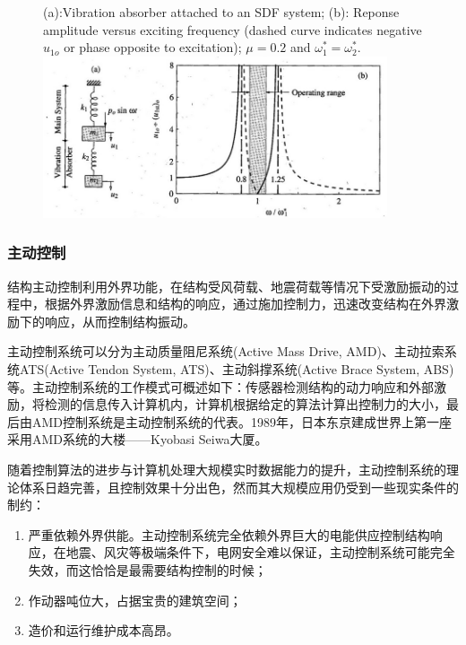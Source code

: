 	\begin{figure}[H]
		\centering
		{(a):Vibration absorber attached to an SDF system; (b): Reponse amplitude versus exciting frequency (dashed curve indicates negative $u_{1o}$ or phase opposite to excitation); $\mu=0.2$ and $\omega_1^*=\omega_2^*$.}
		\label{double}
		\includegraphics[width=4in]{figure/double}
	\end{figure}
	

\subsubsection{主动控制}
结构主动控制利用外界功能，在结构受风荷载、地震荷载等情况下受激励振动的过程中，根据外界激励信息和结构的响应，通过施加控制力，迅速改变结构在外界激励下的响应，从而控制结构振动。

主动控制系统可以分为主动质量阻尼系统(Active Mass Drive, AMD)、主动拉索系统ATS(Active Tendon System, ATS)、主动斜撑系统(Active Brace System, ABS)等。主动控制系统的工作模式可概述如下：传感器检测结构的动力响应和外部激励，将检测的信息传入计算机内，计算机根据给定的算法计算出控制力的大小，最后由AMD控制系统是主动控制系统的代表。1989年，日本东京建成世界上第一座采用AMD系统的大楼——Kyobasi Seiwa大厦\cite{T.KoboriN.KoshikaN.Yamada1991}。

随着控制算法的进步与计算机处理大规模实时数据能力的提升，主动控制系统的理论体系日趋完善，且控制效果十分出色，然而其大规模应用仍受到一些现实条件的制约：
\begin{enumerate}[leftmargin=*,labelindent=16pt,label=\bfseries \arabic*.]
	\item 严重依赖外界供能。主动控制系统完全依赖外界巨大的电能供应控制结构响应，在地震、风灾等极端条件下，电网安全难以保证，主动控制系统可能完全失效，而这恰恰是最需要结构控制的时候；
	\item 作动器吨位大，占据宝贵的建筑空间\cite{lou2013}；
	\item 造价和运行维护成本高昂。
\end{enumerate}

